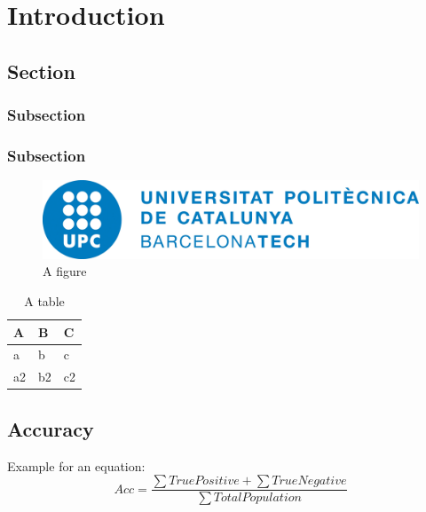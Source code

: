\chapter{Introduction}

\section{Section}

\subsection{Subsection}

\subsection{Subsection}

\begin{figure}[H]
\centering
\includegraphics[scale=0.5]{img/title/upc}
\caption{A figure}
\label{sf_map} 
\end{figure}


\begin{table}[H]
\centering
\begin{tabular}{@{}lll@{}}
\toprule
\textbf{A}  & \textbf{B} & \textbf{C}\\ 
\midrule
a & \multicolumn{1}{l|}{b} & c \\
a2 & \multicolumn{1}{l|}{b2} & c2 \\
\bottomrule
\end{tabular}
\caption{A table}
\label{tab:tab1}
\end{table}

\section{Accuracy}
Example for an equation:
\[ Acc = \frac{\sum{True Positive} + \sum{True Negative}}{\sum{Total Population}} \]